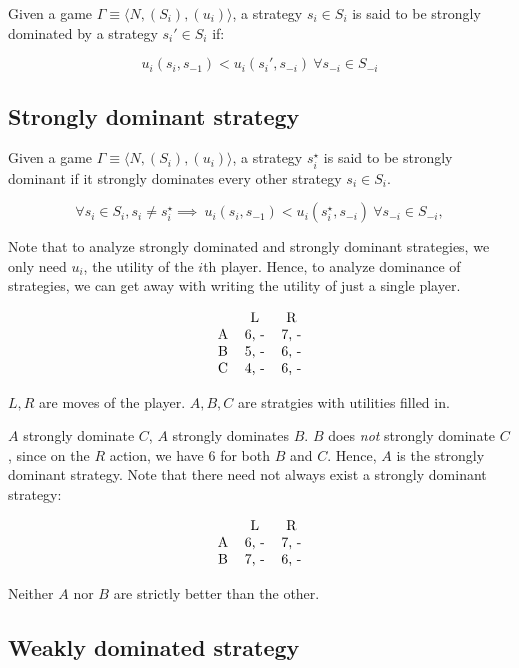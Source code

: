 \documentclass[11pt]{book}
\begin{document}
Given a game $\Gamma \equiv \langle N, (S_i), (u_i) \rangle$, a strategy
$s_i \in S_i$ is said to be strongly dominated by a strategy $s_i' \in S_i$
if:

$$
u_i(s_i, s_{-1}) < u_i(s_i', s_{-i})~ \forall s_{-i} \in S_{-i}
$$

\subsection{Strongly dominant strategy}

Given a game $\Gamma \equiv \langle N, (S_i), (u_i) \rangle$, a strategy
$s_i^\star$ is said to be strongly dominant if it strongly dominates every
other strategy $s_i \in S_i$.

$$
\forall s_i \in S_i, s_i \neq s_i^\star \implies ~ u_i(s_i, s_{-1}) < u_i(s_i^\star, s_{-i})~ \forall s_{-i} \in S_{-i}, 
$$

Note that to analyze strongly dominated and strongly dominant strategies,
we only need $u_i$, the utility of the $i$th player. Hence, to analyze
dominance of strategies, we can get away with writing the utility of
just a single player.

$$
\begin{tabular}{ccc}
    & L & R \\
  A & 6, - & 7, - \\
  B & 5, - & 6, - \\
  C & 4, - & 6, - \\
\end{tabular}
$$

$L, R$ are moves of the player.
$A, B, C$ are stratgies with utilities filled
in.

$A$ strongly dominate $C$, $A$ strongly dominates $B$. $B$ does \emph{not}
strongly dominate $C$, since on the $R$ action, we have $6$ for both $B$ and $C$.
Hence, $A$ is the strongly dominant strategy. Note that there need not always
exist a strongly dominant strategy:

$$
\begin{tabular}{ccc}
    & L & R \\
  A & 6, - & 7, - \\
  B & 7, - & 6, - \\
\end{tabular}
$$

Neither $A$ nor $B$ are strictly better than the other.

\subsection{Weakly dominated strategy}
\end{document}
